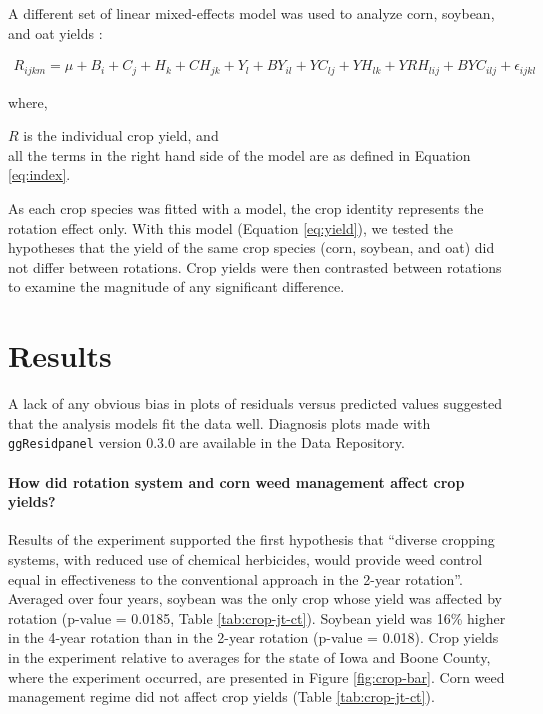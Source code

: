 \documentclass[
]{article}
\begin{document}
A different set of linear mixed-effects model was used to analyze corn, soybean, and oat yields \citep[\texttt{lme4} version 1.1-27.1,][]{batesLme4LinearMixedEffects2021}:

\begin{align}
R_{ijkm} = \mu + B_i + C_j + H_k + CH_{jk} + Y_l + BY_{il} + YC_{lj} + YH_{lk}  + YRH_{lij} + BYC_{ilj} + \epsilon_{ijkl}
\label{eq:yield}
\end{align}

where,

\(R\) is the individual crop yield, and\\
all the terms in the right hand side of the model are as defined in Equation \eqref{eq:index}.

As each crop species was fitted with a model, the crop identity represents the rotation effect only. With this model (Equation \eqref{eq:yield}), we tested the hypotheses that the yield of the same crop species (corn, soybean, and oat) did not differ between rotations. Crop yields were then contrasted between rotations to examine the magnitude of any significant difference.

\hypertarget{results}{%
\section*{Results}\label{results}}

A lack of any obvious bias in plots of residuals versus predicted values suggested that the analysis models fit the data well. Diagnosis plots made with \texttt{ggResidpanel} version 0.3.0 \citep{goodeGgResidpanelPanelsInteractive2019} are available in the Data Repository.

\hypertarget{how-did-rotation-system-and-corn-weed-management-affect-crop-yields}{%
\paragraph*{How did rotation system and corn weed management affect crop yields?}\label{how-did-rotation-system-and-corn-weed-management-affect-crop-yields}}

Results of the experiment supported the first hypothesis that ``diverse cropping systems, with reduced use of chemical herbicides, would provide weed control equal in effectiveness to the conventional approach in the 2-year rotation''. Averaged over four years, soybean was the only crop whose yield was affected by rotation (p-value = 0.0185, Table \ref{tab:crop-jt-ct}). Soybean yield was 16\% higher in the 4-year rotation than in the 2-year rotation (p-value = 0.018). Crop yields in the experiment relative to averages for the state of Iowa and Boone County, where the experiment occurred, are presented in Figure \ref{fig:crop-bar}. Corn weed management regime did not affect crop yields (Table \ref{tab:crop-jt-ct}).
\end{document}
